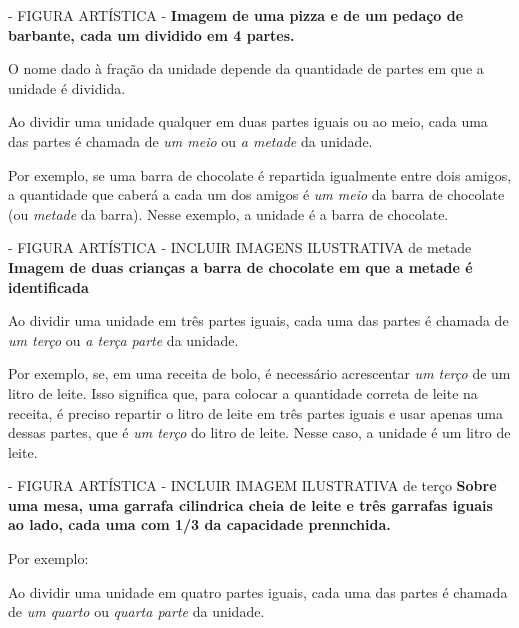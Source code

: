 \documentclass[a4,12pt]{book}
\begin{document}
\begin{imagem*}[breakable]{}{}   - FIGURA ARTÍSTICA -
  {\bf Imagem de uma pizza e de um pedaço de barbante, cada um dividido em 4 partes.}
\end{imagem*}

O nome dado à fração da unidade depende da quantidade de partes em que a unidade é dividida.

Ao dividir uma unidade qualquer em duas partes iguais ou ao meio, cada uma das partes é chamada de {\it um meio} ou {\it a metade} da unidade.

Por exemplo, se uma barra de chocolate é repartida igualmente entre dois amigos, a quantidade que caberá a cada um dos amigos é {\it um meio} da barra de chocolate (ou {\it metade} da barra). Nesse exemplo, a unidade é a barra de chocolate.

\begin{imagem*}[breakable]{}{}   - FIGURA ARTÍSTICA - INCLUIR IMAGENS ILUSTRATIVA de metade
  {\bf Imagem de duas crianças a barra de chocolate em que a metade é identificada}
\end{imagem*}

Ao dividir uma unidade em três partes iguais, cada uma das partes é chamada de {\it um terço} ou {\it a terça parte} da unidade.

Por exemplo, se, em uma receita de bolo, é necessário acrescentar {\it um terço} de um litro de leite. Isso significa que, para colocar a quantidade correta de leite na receita, é preciso repartir o litro de leite em três partes iguais e usar apenas uma dessas partes, que é {\it um terço} do litro de leite. Nesse caso, a unidade é um litro de leite.

\begin{imagem*}[breakable]{}{}   - FIGURA ARTÍSTICA - INCLUIR IMAGEM ILUSTRATIVA de terço
  {\bf Sobre uma mesa, uma garrafa cilindrica cheia de leite e três garrafas iguais ao lado, cada uma com 1/3 da capacidade prennchida.}

  Por exemplo:

\end{imagem*}

Ao dividir uma unidade em quatro partes iguais, cada uma das partes é chamada de {\it um quarto} ou {\it quarta parte} da unidade.
\end{document}
